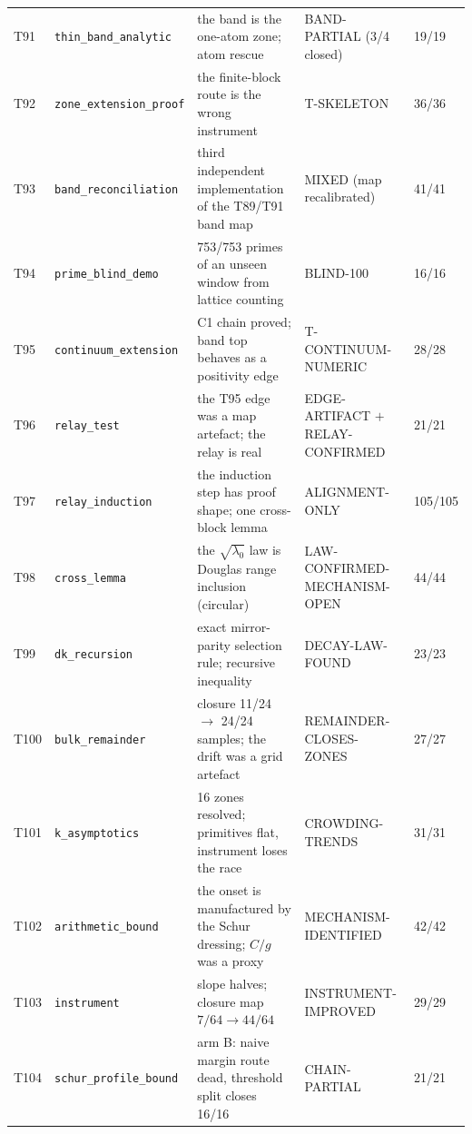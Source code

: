 \documentclass[11pt,a4paper]{article}
\begin{document}
{\begin{xltabular}{\linewidth}{@{}p{0.95cm} >{\raggedright\arraybackslash}p{3.1cm} Y >{\raggedright\scriptsize\arraybackslash}p{3.35cm} p{1.15cm}@{}}
T91 & \texttt{\scriptsize thin\_\allowbreak band\_\allowbreak analytic} & the band is the one-atom zone; atom rescue & BAND-PARTIAL (3/4 closed) & 19/19\\
T92 & \texttt{\scriptsize zone\_\allowbreak extension\_\allowbreak proof} & the finite-block route is the wrong instrument & T-SKELETON & 36/36\\
T93 & \texttt{\scriptsize band\_\allowbreak reconciliation} & third independent implementation of the T89/T91 band map & MIXED (map recalibrated) & 41/41\\
T94 & \texttt{\scriptsize prime\_\allowbreak blind\_\allowbreak demo} & 753/753 primes of an unseen window from lattice counting & BLIND-100 & 16/16\\
T95 & \texttt{\scriptsize continuum\_\allowbreak extension} & C1 chain proved; band top behaves as a positivity edge & T-CONTINUUM-NUMERIC & 28/28\\
T96 & \texttt{\scriptsize relay\_\allowbreak test} & the T95 edge was a map artefact; the relay is real & EDGE-ARTIFACT $+$ RELAY-CONFIRMED & 21/21\\
T97 & \texttt{\scriptsize relay\_\allowbreak induction} & the induction step has proof shape; one cross-block lemma & ALIGNMENT-ONLY & 105/105\\
T98 & \texttt{\scriptsize cross\_\allowbreak lemma} & the $\sqrt{\lambda_0}$ law is Douglas range inclusion (circular) & LAW-CONFIRMED-MECHANISM-OPEN & 44/44\\
T99 & \texttt{\scriptsize dk\_\allowbreak recursion} & exact mirror-parity selection rule; recursive inequality & DECAY-LAW-FOUND & 23/23\\
T100 & \texttt{\scriptsize bulk\_\allowbreak remainder} & closure 11/24 $\to$ 24/24 samples; the drift was a grid artefact & REMAINDER-CLOSES-ZONES & 27/27\\
T101 & \texttt{\scriptsize k\_\allowbreak asymptotics} & 16 zones resolved; primitives flat, instrument loses the race & CROWDING-TRENDS & 31/31\\
T102 & \texttt{\scriptsize arithmetic\_\allowbreak bound} & the onset is manufactured by the Schur dressing; $C/g$ was a proxy & MECHANISM-IDENTIFIED & 42/42\\
T103 & \texttt{\scriptsize instrument} & slope halves; closure map $7/64\to44/64$ & INSTRUMENT-IMPROVED & 29/29\\
T104 & \texttt{\scriptsize schur\_\allowbreak profile\_\allowbreak bound} & arm B: naive margin route dead, threshold split closes 16/16 & CHAIN-PARTIAL & 21/21\\

\end{xltabular}}
\end{document}
